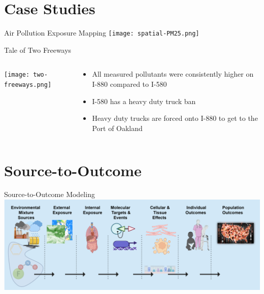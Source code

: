 \documentclass[
  ignorenonframetext,
]{beamer}
\begin{document}
\section{Case Studies}\label{case-studies}

\begin{frame}{Air Pollution Exposure Mapping}
\label{air-pollution-exposure-mapping}
\texttt{[image: spatial-PM25.png]}
\end{frame}

\begin{frame}{Tale of Two Freeways}
\label{tale-of-two-freeways}
\begin{columns}[T]
\begin{column}{0.65\textwidth}
\texttt{[image: two-freeways.png]}
\end{column}

\begin{column}{0.35\textwidth}
\begin{itemize}
\item
  All measured pollutants were consistently higher on I-880 compared to
  I-580
\item
  I-580 has a heavy duty truck ban
\item
  Heavy duty trucks are forced onto I-880 to get to the Port of Oakland
\end{itemize}
\end{column}
\end{columns}
\end{frame}

\section{Source-to-Outcome}\label{source-to-outcome}

\begin{frame}{Source-to-Outcome Modeling}
\label{source-to-outcome-modeling}
\includegraphics{../../presentations/20240214_SOT_ISES_Webinar/Exposome-Cascade.png}
\end{frame}
\end{document}
